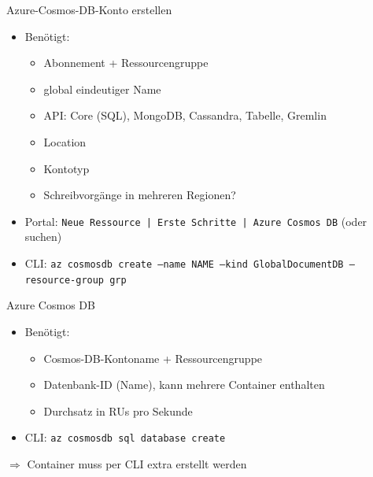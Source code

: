 \begin{flashcard}{Azure-Cosmos-DB-Konto erstellen}
    \begin{itemize}
        \item Benötigt:
        \begin{itemize}
            \item Abonnement + Ressourcengruppe
            \item global eindeutiger Name
            \item API: Core (SQL), MongoDB, Cassandra, Tabelle, Gremlin
            \item Location
            \item Kontotyp
            \item Schreibvorgänge in mehreren Regionen?
        \end{itemize}
        \item Portal: \texttt{Neue Ressource | Erste Schritte | Azure Cosmos DB} (oder suchen)
        \item CLI:\newline
        \texttt{az cosmosdb create --name NAME --kind GlobalDocumentDB --resource-group grp}
    \end{itemize}
\end{flashcard}

\begin{flashcard}{Azure Cosmos DB}
    \begin{itemize}
        \item Benötigt:
        \begin{itemize}
            \item Cosmos-DB-Kontoname + Ressourcengruppe
            \item Datenbank-ID (Name), kann mehrere Container enthalten
            \item Durchsatz in RUs pro Sekunde
        \end{itemize}
        \item CLI:\newline
        \texttt{az cosmosdb sql database create}
    \end{itemize}
    $\Rightarrow$ Container muss per CLI extra erstellt werden
\end{flashcard}

